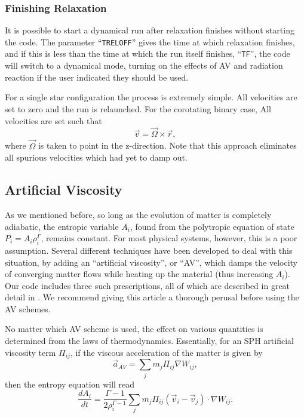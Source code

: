 \subsubsection{Finishing Relaxation}  
\label{nm:re:fi}
It is possible to start a dynamical run after relaxation finishes
without starting the code.  The parameter ``{\tt TRELOFF}'' gives the time
at which relaxation finishes, and if this is less than the time at
which the run itself finishes, ``{\tt TF}'', the code will switch to a
dynamical mode, turning on the effects of AV and radiation reaction if
the user indicated they should be used.

For a single star configuration the process is extremely simple.  All
velocities are set to zero and the run is relaunched.  For the
corotating binary case,  All velocities are set such that
\begin{equation}
\vec{v}=\vec{\Omega}\times\vec{r},
\end{equation}
where $\vec{\Omega}$ is taken to point in the z-direction.  Note that
this approach eliminates all spurious velocities which had yet to damp out.

\subsection{Artificial Viscosity}
\label{nm:av}
As we mentioned before, so long as the evolution of matter is
completely adiabatic, the entropic variable $A_i$, found from the
polytropic equation of state $P_i=A_i\rho_i^\Gamma$, remains
constant.  For most physical systems, however, this is a poor
assumption.  Several different techniques have been developed to deal
with this situation, by adding an ``artificial viscosity'', or ``AV'',
which damps the velocity of converging matter flows while heating up
the material (thus increasing $A_i$).  Our code includes three such
prescriptions, all of which are described in great detail in
\citet{LSRS}.  We recommend giving this article a thorough perusal
before using the AV schemes.

No matter which AV scheme is used, the effect on various quantities is
determined from the laws of thermodynamics.  Essentially, for an
SPH artificial viscosity term $\Pi_{ij}$, if the viscous acceleration of the
matter is given by 
\begin{equation}
\vec{a}_{AV}=\sum_j m_j \Pi_{ij}\nabla W_{ij},\label{eq:vdot} 
\end{equation}
then the entropy equation will read
\begin{equation}
\frac{dA_i}{dt}=\frac{\Gamma-1}{2\rho_i^{\Gamma-1}}\sum_j m_j \Pi_{ij}
(\vec{v}_i-\vec{v}_j)\cdot \nabla W_{ij}.
\label{eq:adot}
\end{equation}

